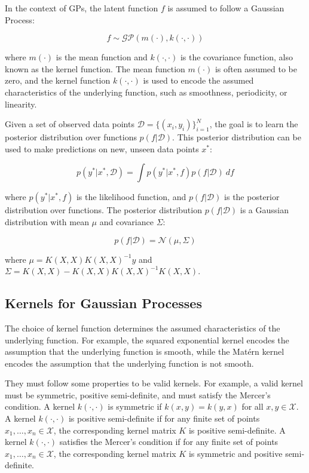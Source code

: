 \documentclass[preprint,journal]{vgtc}       %
\begin{document}
In the context of GPs, the latent function $f$ is assumed to follow a Gaussian Process:

\begin{equation}
    f \sim \mathcal{GP}(m(\cdot), k(\cdot, \cdot))
\end{equation}

where $m(\cdot)$ is the mean function and $k(\cdot, \cdot)$ is the covariance function, also known as the kernel function. The mean function $m(\cdot)$ is often assumed to be zero, and the kernel function $k(\cdot, \cdot)$ is used to encode the assumed characteristics of the underlying function, such as smoothness, periodicity, or linearity.

Given a set of observed data points $\mathcal{D} = \{(x_i, y_i)\}_{i=1}^N$, the goal is to learn the posterior distribution over functions $p(f|\mathcal{D})$. This posterior distribution can be used to make predictions on new, unseen data points $x^*$:

\begin{equation}
    p(y^*|x^*, \mathcal{D}) = \int p(y^*|x^*, f) p(f|\mathcal{D})\ df
\end{equation}

where $p(y^*|x^*, f)$ is the likelihood function, and $p(f|\mathcal{D})$ is the posterior distribution over functions. The posterior distribution $p(f|\mathcal{D})$ is a Gaussian distribution with mean $\mu$ and covariance $\Sigma$:

\begin{equation}
    p(f|\mathcal{D}) = \mathcal{N}(\mu, \Sigma)
\end{equation}
  
  where $\mu = K(X, X)K(X, X)^{-1}y$ and $\Sigma = K(X, X) - K(X, X)K(X, X)^{-1}K(X, X)$.

\subsection{Kernels for Gaussian Processes}

The choice of kernel function determines the assumed characteristics of the underlying function. For example, the squared exponential kernel encodes the assumption that the underlying function is smooth, while the Matérn kernel encodes the assumption that the underlying function is not smooth.

They must follow some properties to be valid kernels. For example, a valid kernel must be symmetric, positive semi-definite, and must satisfy the Mercer's condition. A kernel $k(\cdot, \cdot)$ is symmetric if $k(x, y) = k(y, x)$ for all $x, y \in \mathcal{X}$. A kernel $k(\cdot, \cdot)$ is positive semi-definite if for any finite set of points $x_1, \dots, x_n \in \mathcal{X}$, the corresponding kernel matrix $K$ is positive semi-definite. A kernel $k(\cdot, \cdot)$ satisfies the Mercer's condition if for any finite set of points $x_1, \dots, x_n \in \mathcal{X}$, the corresponding kernel matrix $K$ is symmetric and positive semi-definite.
\end{document}
